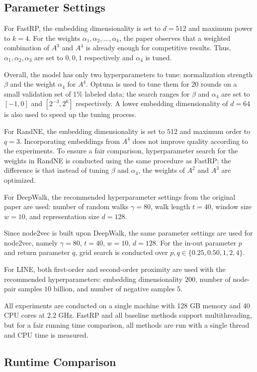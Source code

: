 \documentclass[11pt]{article}
\begin{document}
\subsection{Parameter Settings}

For FastRP, the embedding dimensionality is set to $d=512$ and maximum power to $k=4$. For the weights $\alpha_1,\alpha_2,\ldots,\alpha_k$, the paper observes that a weighted combination of $A^3$ and $A^4$ is already enough for competitive results. Thus, $\alpha_1,\alpha_2,\alpha_3$ are set to $0,0,1$ respectively and $\alpha_4$ is tuned.

Overall, the model has only two hyperparameters to tune: normalization strength $\beta$ and the weight $\alpha_4$ for $A^4$. Optuna is used to tune them for 20 rounds on a small validation set of 1\% labeled data; the search ranges for $\beta$ and $\alpha_4$ are set to $[-1,0]$ and $[2^{-3},2^6]$ respectively. A lower embedding dimensionality of $d=64$ is also used to speed up the tuning process.

For RandNE, the embedding dimensionality is set to $512$ and maximum order to $q=3$. Incorporating embeddings from $A^4$ does not improve quality according to the experiments. To ensure a fair comparison, hyperparameter search for the weights in RandNE is conducted using the same procedure as FastRP; the difference is that instead of tuning $\beta$ and $\alpha_4$, the weights of $A^2$ and $A^3$ are optimized.

For DeepWalk, the recommended hyperparameter settings from the original paper are used: number of random walks $\gamma=80$, walk length $t=40$, window size $w=10$, and representation size $d=128$.

Since node2vec is built upon DeepWalk, the same parameter settings are used for node2vec, namely $\gamma=80$, $t=40$, $w=10$, $d=128$. For the in-out parameter $p$ and return parameter $q$, grid search is conducted over $p,q \in \{0.25,0.50,1,2,4\}$.

For LINE, both first-order and second-order proximity are used with the recommended hyperparameters: embedding dimensionality $200$, number of node-pair samples $10$ billion, and number of negative samples $5$.

All experiments are conducted on a single machine with 128 GB memory and 40 CPU cores at 2.2 GHz. FastRP and all baseline methods support multithreading, but for a fair running time comparison, all methods are run with a single thread and CPU time is measured.

\subsection{Runtime Comparison}
\end{document}
